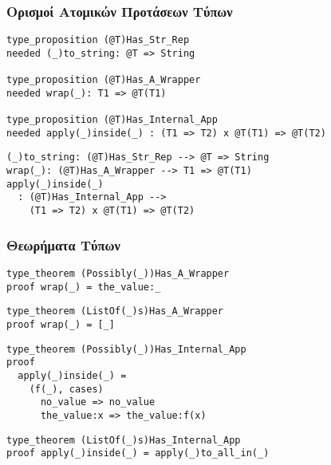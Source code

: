 \documentclass{beamer}
\begin{document}
\begin{frame}[fragile]

\frametitle{Ορισμοί Ατομικών Προτάσεων Τύπων}

\begin{otherlanguage}{english}
\begin{verbatim}
type_proposition (@T)Has_Str_Rep
needed (_)to_string: @T => String

type_proposition (@T)Has_A_Wrapper
needed wrap(_): T1 => @T(T1)

type_proposition (@T)Has_Internal_App
needed apply(_)inside(_) : (T1 => T2) x @T(T1) => @T(T2)
\end{verbatim}
\pause
\begin{verbatim}
(_)to_string: (@T)Has_Str_Rep --> @T => String
wrap(_): (@T)Has_A_Wrapper --> T1 => @T(T1)
apply(_)inside(_)
  : (@T)Has_Internal_App -->
    (T1 => T2) x @T(T1) => @T(T2)
\end{verbatim}
\end{otherlanguage}

\end{frame}

\begin{frame}[fragile]

\frametitle{Θεωρήματα Τύπων}

\begin{otherlanguage}{english}
\begin{verbatim}
type_theorem (Possibly(_))Has_A_Wrapper
proof wrap(_) = the_value:_
\end{verbatim}
\pause
\begin{verbatim}
type_theorem (ListOf(_)s)Has_A_Wrapper
proof wrap(_) = [_]
\end{verbatim}
\pause
\begin{verbatim}
type_theorem (Possibly(_))Has_Internal_App
proof
  apply(_)inside(_) =
    (f(_), cases)
      no_value => no_value
      the_value:x => the_value:f(x)
\end{verbatim}
\pause
\begin{verbatim}
type_theorem (ListOf(_)s)Has_Internal_App
proof apply(_)inside(_) = apply(_)to_all_in(_)
\end{verbatim}
\end{otherlanguage}

\end{frame}
\end{document}
